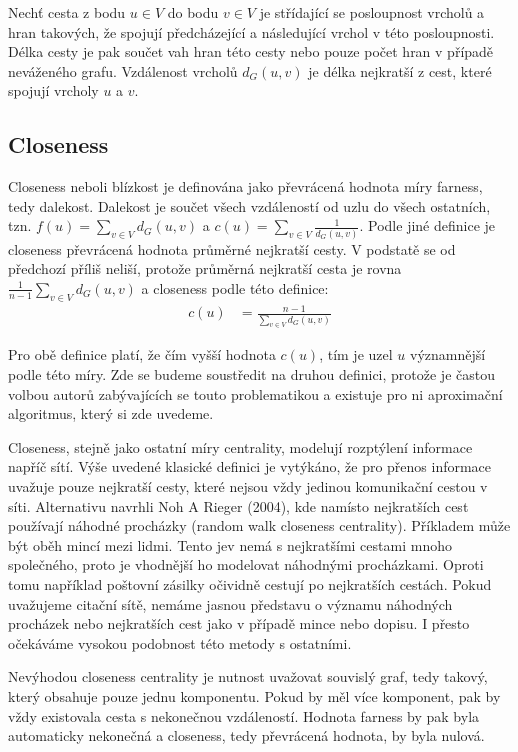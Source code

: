 \documentclass[12pt,titlepage]{report}
\begin{document}
Nechť cesta z bodu $u \in V$ do bodu $v \in V$ je střídající se posloupnost
vrcholů a hran takových, že spojují předcházející a následující vrchol v této
posloupnosti. Délka cesty je pak součet vah hran této cesty nebo pouze počet
hran v případě neváženého grafu. Vzdálenost vrcholů $d_G(u, v)$ je délka
nejkratší z cest, které spojují vrcholy $u$ a $v$.

\subsection{Closeness}
Closeness neboli blízkost je definována jako převrácená hodnota míry farness,
tedy dalekost. Dalekost je součet všech vzdáleností od uzlu do všech ostatních,
tzn. $f(u) = \sum_{v \in V} d_G(u, v)$ a $c(u) = \sum_{v \in V} \frac{1}{d_G(u,
v)}$. Podle jiné definice je closeness převrácená hodnota průměrné nejkratší
cesty. V podstatě se od předchozí příliš neliší, protože průměrná nejkratší
cesta je rovna $\frac{1}{n
- 1} \sum_{v \in V} d_G(u, v)$ a closeness podle této definice:
\begin{align*}
c(u) &= \frac{n - 1}{\sum_{v \in V} d_G(u, v)}
\end{align*}

Pro obě definice platí, že čím vyšší hodnota $c(u)$, tím je uzel $u$
významnější podle této míry. Zde se budeme soustředit na druhou definici,
protože je častou volbou autorů zabývajících se touto problematikou a existuje
pro ni aproximační algoritmus, který si zde uvedeme.

Closeness, stejně jako ostatní míry centrality, modelují rozptýlení informace
napříč sítí. Výše uvedené klasické definici je vytýkáno, že pro přenos
informace uvažuje pouze nejkratší cesty, které nejsou vždy jedinou komunikační
cestou v síti. Alternativu navrhli Noh A Rieger (2004), kde namísto nejkratších
cest používají náhodné procházky (random walk closeness centrality). Příkladem
může být oběh mincí mezi lidmi. Tento jev nemá s nejkratšími cestami mnoho
společného, proto je vhodnější ho modelovat náhodnými procházkami. Oproti tomu
například poštovní zásilky očividně cestují po nejkratších cestách.  Pokud
uvažujeme citační sítě, nemáme jasnou představu o významu náhodných procházek
nebo nejkratších cest jako v případě mince nebo dopisu. I přesto očekáváme
vysokou podobnost této metody s ostatními.

Nevýhodou closeness centrality je nutnost uvažovat souvislý graf, tedy takový,
který obsahuje pouze jednu komponentu. Pokud by měl více komponent, pak by vždy
existovala cesta s nekonečnou vzdáleností. Hodnota farness by pak byla
automaticky nekonečná a closeness, tedy převrácená hodnota, by byla nulová. 
\end{document}
